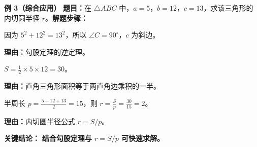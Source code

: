 \begin{examplebox}
	\medskip
	\textbf{\textcolor{CExample}{例 3（综合应用）}}
	\textbf{\textcolor{CExample}{题目：}}在 $\triangle ABC$ 中，$a=5$，$b=12$，$c=13$，求该三角形的内切圆半径 $r$。\textbf{\textcolor{CExample}{解题步骤：}}
	\begin{description}[style=nextline, leftmargin=2.8em, labelsep=0.5em, itemsep=0.45em]
		\item[\textbf{第一步（判断三角形类型）：}]
			因为 $5^2 + 12^2 = 13^2$，所以 $\angle C = 90^\circ$，$c$ 为斜边。
			\par\textbf{理由：}勾股定理的逆定理。
		\item[\textbf{第二步（计算三角形面积）：}]
			$S = \frac{1}{2} \times 5 \times 12 = 30$。
			\par\textbf{理由：}直角三角形面积等于两直角边乘积的一半。
		\item[\textbf{第三步（求内切圆半径）：}]
			半周长 $p = \frac{5+12+13}{2} = 15$，则 $r = \frac{S}{p} = \frac{30}{15} = 2$。
			\par\textbf{理由：}内切圆半径公式 $r = S/p$。
	\end{description}
	\textbf{\textcolor{CExample}{关键结论：}}
	\textbf{结合勾股定理与 $r=S/p$ 可快速求解。}
\end{examplebox}
